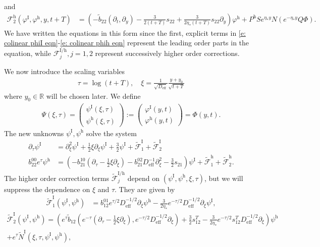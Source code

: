 \documentclass[11pt]{article}
\newcommand{\R}{\mathbb{R}}
\renewcommand{\phi}{\varphi}
\numberwithin{equation}{section}
\numberwithin{prop}{section}
\newcommand{\phih}{\phi^\mathrm{h}}
\newcommand{\psih}{\psi^\mathrm{h}}
\newcommand{\Deff}{D_\mathrm{eff}}
\newcommand{\phiI}{\phi^\mathrm{I}}
\newcommand{\Fh}{\mathcal{F}^\mathrm{h}}
\newcommand{\tfi}{\tilde{\mathcal{F}}^\mathrm{I}}
\newcommand{\tfh}{\tilde{\mathcal{F}}^\mathrm{h}}
\newcommand{\psiI}{\psi^\mathrm{I}}
\newcommand{\Ph}{P^\mathrm{h}}
\begin{document}
and
\begin{align}
\Fh_2  (\phiI, \phih, y, t+T) &= \left( - \tilde{b}_{22} (\partial_t, \partial_y) - \frac{3}{2(t+T)} s_{22} + \frac{3}{2 \eta_* (t+T)} s_{22} \partial_y \right) \phih + \Ph S e^{\eta_* y} N \left(e^{-\eta_* y} Q \Phi \right). 
\end{align}
We have written the equations in this form since the first, explicit terms in \eqref{e: colinear phiI eqn}-\eqref{e: colinear phih eqn} represent the leading order parts in the equation, while $\mathcal{F}^\mathrm{I/h}_{j}, j = 1,2$ represent successively higher order corrections. 

We now introduce the scaling variables
\begin{align}
\tau = \log (t+T), \quad \xi = \frac{1}{\sqrt{\Deff}} \frac{y+y_0}{\sqrt{t+T}}
\end{align}
where $y_0 \in \R$ will be chosen later. We define
\begin{align}
\Psi(\xi, \tau) = \begin{pmatrix}
\psiI (\xi, \tau) \\ \psih(\xi, \tau) 
\end{pmatrix}
:= 
\begin{pmatrix}
\phiI(y, t) \\ \phih(y, t) 
\end{pmatrix}
 = \Phi(y,t). 
\end{align}
The new unknowns $\psiI, \psih$ solve the system
\begin{align}
\partial_\tau \psiI &= \partial_\xi^2 \psiI + \frac{1}{2} \xi \partial_\xi \psiI + \frac{3}{2} \psiI + \tfi_1 + \tfi_2 \label{e: colinear psiI eqn} \\
b_{22}^{00} e^\tau \psih &= \left( -b_{21}^{10} (\partial_\tau - \frac{1}{2} \xi \partial_\xi) - b_{21}^{02} \Deff^{-1} \partial_\xi^2 - \frac{3}{2} s_{21} \right) \psiI + \tfh_1 + \tfh_2. \label{e: colinear psih eqn}
\end{align}
The higher order correction terms $\tilde{\mathcal{F}}^\mathrm{I/h}_j$ depend on $(\psiI, \psih, \xi, \tau)$, but we will suppress the dependence on $\xi$ and $\tau$. They are given by 
\begin{align}
\tfi_1 (\psiI, \psih) &= b_{12}^{01} e^{\tau/2} \Deff^{-1/2} \partial_\xi \psih - \frac{3}{2 \eta_*} e^{-\tau/2} \Deff^{-1/2} \partial_\xi \psiI, \label{e: colinear tfi 1 def}
\end{align}
\begin{multline}
\tfi_2 (\psiI, \psih) = \left( e^\tau \tilde{b}_{12} \left(e^{-\tau} (\partial_\tau - \frac{1}{2} \xi \partial_\xi), e^{-\tau/2} \Deff^{-1/2} \partial_\xi \right) + \frac{3}{2} s_{12}^T - \frac{3}{2 \eta_*} e^{-\tau/2} s_{12}^T \Deff^{-1/2} \partial_\xi \right) \psih \\ + e^\tau \tilde{N}^\mathrm{I} (\xi, \tau, \psiI, \psih), 
\end{multline}
\end{document}
